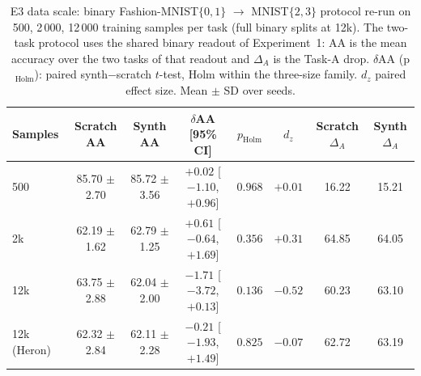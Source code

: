 \begin{table}[ht]
\centering
\small
\setlength{\tabcolsep}{4pt}
\caption{E3 data scale: binary Fashion-MNIST$\{0,1\}$ $\to$ MNIST$\{2,3\}$ protocol re-run on {500, 2\,000, 12\,000} training samples per task (full binary splits at 12k). The two-task protocol uses the shared binary readout of Experiment~1: AA is the mean accuracy over the two tasks of that readout and $\Delta_A$ is the Task-A drop. $\delta$AA (p$_{\text{Holm}}$): paired synth$-$scratch $t$-test, Holm within the three-size family. $d_z$ paired effect size. Mean $\pm$ SD over seeds.}
\label{tab:e234_scale}
\begin{tabular}{lccccccc}
\toprule
Samples & Scratch AA & Synth AA & $\delta$AA [95\% CI] & $p_{\text{Holm}}$ & $d_z$ & Scratch $\Delta_A$ & Synth $\Delta_A$ \\
\midrule
500 & 85.70 $\pm$ 2.70 & 85.72 $\pm$ 3.56 & $+0.02$ [$-1.10$, $+0.96$] & $0.968$ & $+0.01$ & 16.22 & 15.21 \\
2k & 62.19 $\pm$ 1.62 & 62.79 $\pm$ 1.25 & $+0.61$ [$-0.64$, $+1.69$] & $0.356$ & $+0.31$ & 64.85 & 64.05 \\
12k & 63.75 $\pm$ 2.88 & 62.04 $\pm$ 2.00 & $-1.71$ [$-3.72$, $+0.13$] & $0.136$ & $-0.52$ & 60.23 & 63.10 \\
12k (Heron) & 62.32 $\pm$ 2.84 & 62.11 $\pm$ 2.28 & $-0.21$ [$-1.93$, $+1.49$] & $0.825$ & $-0.07$ & 62.72 & 63.19 \\
\bottomrule
\end{tabular}
\end{table}
